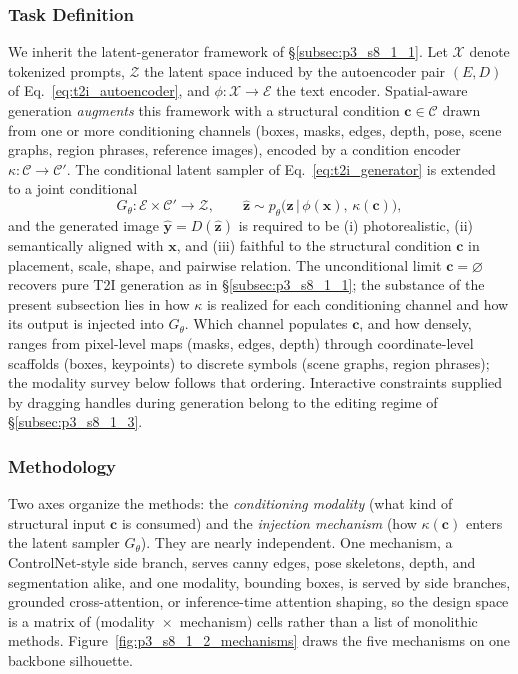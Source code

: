 \subsubsection{Task Definition}
\label{subsubsec:p3_s8_1_2_task}
We inherit the latent-generator framework of §\ref{subsec:p3_s8_1_1}.
Let $\mathcal{X}$ denote tokenized prompts, $\mathcal{Z}$ the latent space induced by the autoencoder pair $(E,D)$ of Eq.~\eqref{eq:t2i_autoencoder}, and $\phi:\mathcal{X}\!\rightarrow\!\mathcal{E}$ the text encoder.
Spatial-aware generation \emph{augments} this framework with a structural condition $\mathbf{c}\in\mathcal{C}$ drawn from one or more conditioning channels (boxes, masks, edges, depth, pose, scene graphs, region phrases, reference images), encoded by a condition encoder $\kappa:\mathcal{C}\!\rightarrow\!\mathcal{C}'$.
The conditional latent sampler of Eq.~\eqref{eq:t2i_generator} is extended to a joint conditional
\begin{equation}
G_\theta:\mathcal{E}\times\mathcal{C}'\rightarrow\mathcal{Z},\qquad \hat{\mathbf{z}}\sim p_\theta\!\big(\mathbf{z}\,\big|\,\phi(\mathbf{x}),\,\kappa(\mathbf{c})\big),
\label{eq:t2i_spatial_objective}
\end{equation}
and the generated image $\hat{\mathbf{y}}=D(\hat{\mathbf{z}})$ is required to be (i) photorealistic, (ii) semantically aligned with $\mathbf{x}$, and (iii) faithful to the structural condition $\mathbf{c}$ in placement, scale, shape, and pairwise relation.
The unconditional limit $\mathbf{c}=\varnothing$ recovers pure T2I generation as in §\ref{subsec:p3_s8_1_1}; the substance of the present subsection lies in how $\kappa$ is realized for each conditioning channel and how its output is injected into $G_\theta$.
Which channel populates $\mathbf{c}$, and how densely, ranges from pixel-level maps (masks, edges, depth) through coordinate-level scaffolds (boxes, keypoints) to discrete symbols (scene graphs, region phrases); the modality survey below follows that ordering.
Interactive constraints supplied by dragging handles during generation belong to the editing regime of §\ref{subsec:p3_s8_1_3}.


\subsubsection{Methodology}
\label{subsubsec:p3_s8_1_2_methodology}
Two axes organize the methods: the \emph{conditioning modality} (what kind of structural input $\mathbf{c}$ is consumed) and the \emph{injection mechanism} (how $\kappa(\mathbf{c})$ enters the latent sampler $G_\theta$).
They are nearly independent. One mechanism, a ControlNet-style side branch, serves canny edges, pose skeletons, depth, and segmentation alike, and one modality, bounding boxes, is served by side branches, grounded cross-attention, or inference-time attention shaping, so the design space is a matrix of (modality~$\times$~mechanism) cells rather than a list of monolithic methods.
Figure~\ref{fig:p3_s8_1_2_mechanisms} draws the five mechanisms on one backbone silhouette.

